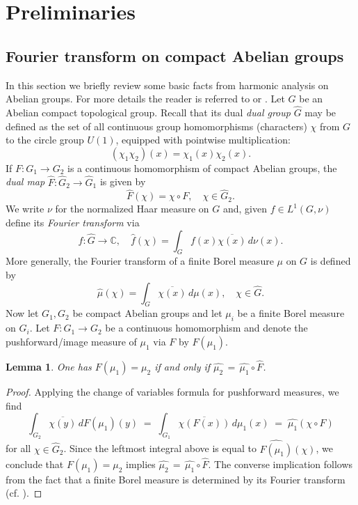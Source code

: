 \documentclass[11pt,reqno]{amsart}
\numberwithin{equation}{section}
\newtheorem{lemma}[theorem]{Lemma}
\theoremstyle{remark}
\theoremstyle{rmdefinition}
\begin{document}
\section{Preliminaries}\label{prelimsec}
\subsection{Fourier transform on compact Abelian groups} In this section we briefly review some basic facts from harmonic analysis on Abelian groups. For more details the reader is referred to \cite{Ru} or \cite{Fo}.
Let \( G \) be an Abelian compact topological group. Recall that its dual 
\emph{dual group} \( \widehat{G} \) may be defined as the set of all continuous group homomorphisms (characters) $\chi$ from $G$ to the circle group $U(1)$,
equipped with pointwise multiplication:
\[
(\chi_1 \chi_2)(x) = \chi_1(x) \chi_2(x).
\]
If \( F: G_1 \to G_2 \) is a continuous homomorphism of compact Abelian groups, the \emph{dual map}
$
\widehat{F} : \widehat{G}_2 \to \widehat{G}_1
$
is given by
\[
\widehat{F}(\chi) = \chi \circ F, \quad \chi \in \widehat{G}_2.
\]
We write $\nu$ for the normalized Haar measure on $G$ and, given $f \in  L^1(G,\nu)$ define its \emph{Fourier transform} via
\[
\widehat{f} : \widehat{G} \to \mathbb{C}, \quad \widehat{f}(\chi) = \int_G f(x) \overline{\chi(x)} \, d\nu(x).
\]
More generally, the Fourier transform of a finite Borel measure \( \mu \) on \( G \) is defined by
\[
\widehat{\mu}(\chi) = \int_G \overline{\chi(x)} \, d\mu(x), \quad \chi \in \widehat{G}.
\]
Now let \( G_1, G_2 \) be compact Abelian groups and let \( \mu_i\) be a finite Borel measure on $G_i$. Let \( F: G_1 \to G_2 \) be a continuous homomorphism and denote the pushforward/image measure of \( \mu_1\) via $F$ by $F(\mu_1)$.
\begin{lemma}\label{pushfofour}
One has \( F(\mu_1) = \mu_2 \) if and only if 
\(\widehat{\mu_2} \,=\, \widehat{\mu_1} \circ \widehat{F}\).
\end{lemma}
\begin{proof}
Applying the change of variables formula for pushforward measures, we find
$$
\int_{G_2} \overline{\chi(y)}\,dF(\mu_1)(y)
\;=\;
\int_{G_1} \overline{\chi(F(x))}\,d\mu_1(x)
\;=\;
\widehat{\mu_1}(\chi\circ F)
$$
for all $\chi \in \widehat{G}_2$. Since the leftmost integral above is equal to \(\widehat{F(\mu_1)}(\chi)\), we conclude that \(F(\mu_1)=\mu_2\) implies 
\(\widehat{\mu_2} \,=\, \widehat{\mu_1} \circ \widehat{F}\).
The converse implication follows from the fact that a finite Borel measure is determined by its Fourier transform (cf. \cite[(4.33)]{Fo}).
\end{proof}
\end{document}
